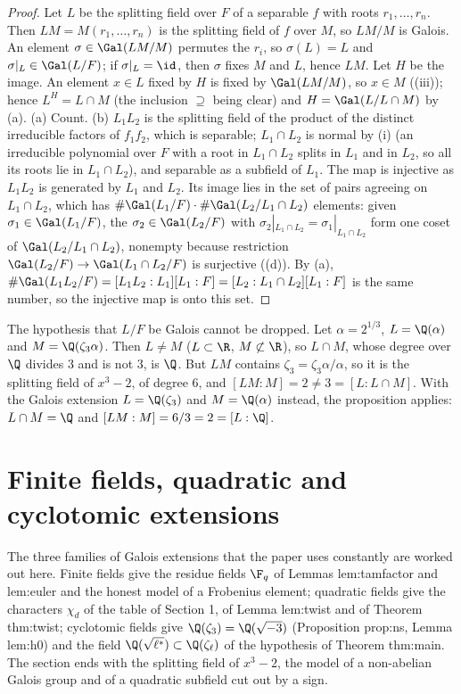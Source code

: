 \begin{proof}
Let $L$ be the splitting field over $F$ of a separable $f$ with roots $r_1,\dots,r_n$. Then $LM=M(r_1,\dots,r_n)$ is the splitting field of $f$ over $M$, so
$LM/M$ is Galois. An element $\sigma\in\Gal(LM/M)$ permutes the $r_i$, so $\sigma(L)=L$ and $\sigma|_L\in\Gal(L/F)$; if $\sigma|_L=\id$, then $\sigma$ fixes $M$
and $L$, hence $LM$. Let $H$ be the image. An element $x\in L$ fixed by $H$ is fixed by $\Gal(LM/M)$, so $x\in M$ ((iii));
hence $L^H=L\cap M$ (the inclusion $\supseteq$ being clear) and $H=\Gal(L/L\cap M)$ by (a).
(a) Count. (b) $L_1L_2$ is the splitting field of the product of the distinct irreducible factors of $f_1f_2$, which is separable; $L_1\cap L_2$ is normal by
(i) (an irreducible polynomial over $F$ with a root in $L_1\cap L_2$ splits in $L_1$ and in $L_2$, so all its roots lie in $L_1\cap L_2$),
and separable as a subfield of $L_1$. The map is injective as $L_1L_2$ is generated by $L_1$ and $L_2$. Its image lies in the set of pairs agreeing on
$L_1\cap L_2$, which has $\#\Gal(L_1/F)\cdot\#\Gal(L_2/L_1\cap L_2)$ elements: given $\sigma_1\in\Gal(L_1/F)$, the $\sigma_2\in\Gal(L_2/F)$ with
$\sigma_2|_{L_1\cap L_2}=\sigma_1|_{L_1\cap L_2}$ form one coset of $\Gal(L_2/L_1\cap L_2)$, nonempty because restriction $\Gal(L_2/F)\to\Gal(L_1\cap L_2/F)$ is
surjective ((d)). By (a),
$\#\Gal(L_1L_2/F)=[L_1L_2:L_1][L_1:F]=[L_2:L_1\cap L_2][L_1:F]$ is the same number, so the injective map is onto this set.
\end{proof}

The hypothesis that $L/F$ be Galois cannot be dropped. Let $\alpha=2^{1/3}$, $L=\Q(\alpha)$ and $M=\Q(\zeta_3\alpha)$. Then $L\ne M$ ($L\subset\R$, $M\not\subset\R$),
so $L\cap M$, whose degree over $\Q$ divides $3$ and is not $3$, is $\Q$. But $LM$ contains $\zeta_3=\zeta_3\alpha/\alpha$, so it is the splitting field of $x^3-2$, of
degree $6$, and $[LM:M]=2\ne3=[L:L\cap M]$. With the Galois extension $L=\Q(\zeta_3)$ and $M=\Q(\alpha)$ instead, the proposition applies: $L\cap M=\Q$ and
$[LM:M]=6/3=2=[L:\Q]$.

\section{Finite fields, quadratic and cyclotomic extensions}\label{sec:galois:examples}

The three families of Galois extensions that the paper uses constantly are worked out here. Finite fields give the residue fields $\F_q$ of
Lemmas lem:tamfactor and lem:euler and the honest model of a Frobenius element; quadratic fields give the characters $\chi_d$ of the table of Section 1,
of Lemma lem:twist and of Theorem thm:twist; cyclotomic fields give $\Q(\zeta_3)=\Q(\sqrt{-3})$ (Proposition prop:ns, Lemma lem:h0) and the field
$\Q(\sqrt{\ell^*})\subset\Q(\zeta_\ell)$ of the hypothesis of Theorem thm:main. The section ends with the splitting field of $x^3-2$, the model of a
non-abelian Galois group and of a quadratic subfield cut out by a sign.

